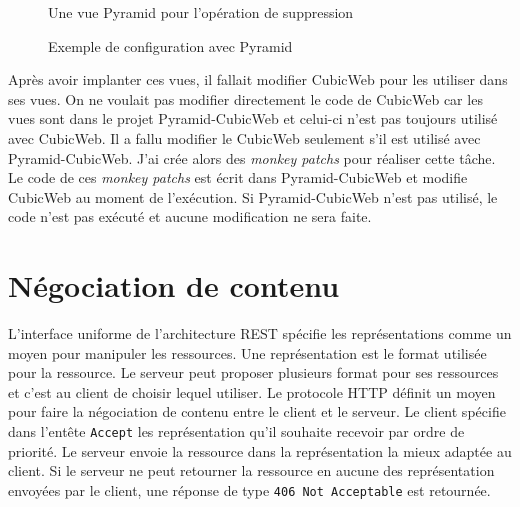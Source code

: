 \begin{figure}[htp]
    \centering
    \caption{Une vue Pyramid pour l'opération de suppression}
    \label{fig:delete}
\end{figure}

\begin{figure}[htp]
    \centering
    \caption{Exemple de configuration avec Pyramid}
    \label{fig:delete}
\end{figure}



Après avoir implanter ces vues, il fallait modifier CubicWeb pour les utiliser dans ses vues. On ne voulait pas modifier directement le code de CubicWeb car les vues sont dans le projet Pyramid-CubicWeb et celui-ci n'est pas toujours utilisé avec CubicWeb. Il a fallu modifier le CubicWeb seulement s'il est utilisé avec Pyramid-CubicWeb. J'ai crée alors des \textit{monkey patchs} pour réaliser cette tâche. Le code de ces \textit{monkey patchs} est écrit dans Pyramid-CubicWeb et modifie CubicWeb au moment de l'exécution. Si Pyramid-CubicWeb n'est pas utilisé, le code n'est pas exécuté et aucune modification ne sera faite.

\section{Négociation de contenu} 
L'interface uniforme de l'architecture REST spécifie les représentations comme un moyen pour manipuler les ressources. Une représentation est le format utilisée pour la ressource. Le serveur peut proposer plusieurs format pour ses ressources et c'est au client de choisir lequel utiliser. Le protocole HTTP définit un moyen pour faire la négociation de contenu entre le client et le serveur. Le client spécifie dans l'entête \texttt{Accept} les représentation qu'il souhaite recevoir par ordre de priorité. Le serveur envoie la ressource dans la représentation la mieux adaptée au client. Si le serveur ne peut retourner la ressource en aucune des représentation envoyées par le client, une réponse de type \texttt{406 Not Acceptable} est retournée.

